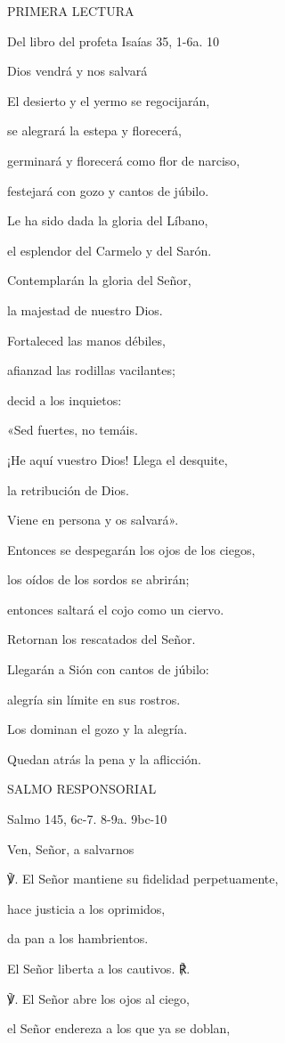 \documentclass[]{article}
\begin{document}
PRIMERA LECTURA

Del libro del profeta Isaías 35, 1-6a. 10

Dios vendrá y nos salvará

El desierto y el yermo se regocijarán,

se alegrará la estepa y florecerá,

germinará y florecerá como flor de narciso,

festejará con gozo y cantos de júbilo.

Le ha sido dada la gloria del Líbano,

el esplendor del Carmelo y del Sarón.

Contemplarán la gloria del Señor,

la majestad de nuestro Dios.

Fortaleced las manos débiles,

afianzad las rodillas vacilantes;

decid a los inquietos:

«Sed fuertes, no temáis.

¡He aquí vuestro Dios! Llega el desquite,

la retribución de Dios.

Viene en persona y os salvará».

Entonces se despegarán los ojos de los ciegos,

los oídos de los sordos se abrirán;

entonces saltará el cojo como un ciervo.

Retornan los rescatados del Señor.

Llegarán a Sión con cantos de júbilo:

alegría sin límite en sus rostros.

Los dominan el gozo y la alegría.

Quedan atrás la pena y la aflicción.

SALMO RESPONSORIAL

Salmo 145, 6c-7. 8-9a. 9bc-10

Ven, Señor, a salvarnos

℣. El Señor mantiene su fidelidad perpetuamente,

hace justicia a los oprimidos,

da pan a los hambrientos.

El Señor liberta a los cautivos. ℟.

℣. El Señor abre los ojos al ciego,

el Señor endereza a los que ya se doblan,
\end{document}
